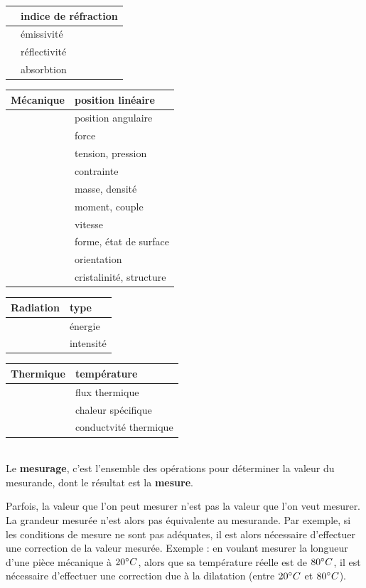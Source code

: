 \begin {center}
\begin{tabular}{|p{3cm}|p{7cm}|}
\hline
 & 	indice de réfraction \\
\hline
 & 	émissivité \\
\hline
 & 	réflectivité \\
\hline
 & 	absorbtion \\
\hline
\end{tabular}
\begin{tabular}{|p{3cm}|p{7cm}|}
Mécanique &	position linéaire \\
\hline
 & 	position angulaire \\
\hline
 & 	force \\
\hline
 & 	tension, pression \\
\hline
 & 	contrainte \\
\hline
 & 	masse, densité \\
\hline
 & 	moment, couple \\
\hline
 & 	vitesse \\
\hline
 & 	forme, état de surface \\
\hline
 & 	orientation \\
\hline
 & 	cristalinité, structure \\
\hline
\end{tabular}
\begin{tabular}{|p{3cm}|p{7cm}|}
Radiation &	type \\
\hline
 & 	énergie \\
\hline
 & 	intensité \\
\hline
\end{tabular}
\begin{tabular}{|p{3cm}|p{7cm}|}
Thermique &	température \\
\hline
 & 	flux thermique \\
\hline
 & 	chaleur spécifique \\
\hline
 & 	conductvité thermique \\
\hline
\end{tabular}
\end{center}
~\\

Le \textbf{mesurage}, c'est l'ensemble des opérations pour déterminer la valeur du mesurande, dont le résultat est la \textbf{mesure}.

Parfois, la valeur que l'on peut mesurer n'est pas la valeur que l'on veut mesurer. La grandeur mesurée n'est alors pas équivalente au mesurande. Par exemple, si les conditions de mesure ne sont pas adéquates, il est alors nécessaire d'effectuer une correction de la valeur mesurée. Exemple : en voulant mesurer la longueur d'une pièce mécanique à $20 \degree C$, alors que sa température réelle est de $80 \degree C$, il est nécessaire d'effectuer une correction due à la dilatation (entre $20 \degree C$ et $80 \degree C$).

